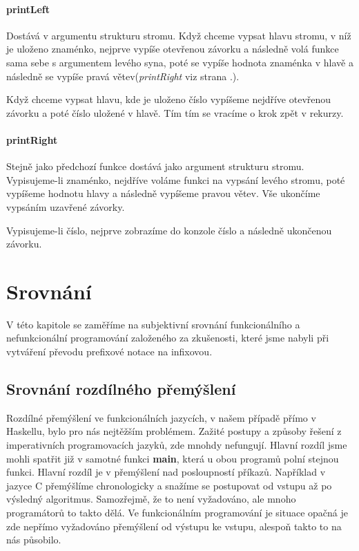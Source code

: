 \documentclass[12pt,a4paper]{report}
\begin{document}
\subsubsection{printLeft} \label{printLeft}
Dostává v argumentu strukturu stromu. Když chceme vypsat hlavu stromu, v níž je uloženo znaménko, nejprve vypíše otevřenou závorku a následně volá funkce sama sebe s argumentem levého syna, poté se vypíše hodnota znaménka v hlavě a následně se vypíše pravá větev(\textit{printRight} viz strana \pageref{printRight}.).

Když chceme vypsat hlavu, kde je uloženo číslo vypíšeme nejdříve otevřenou závorku a poté číslo uložené v hlavě. Tím tím se vracíme o krok zpět v rekurzy.
\newpage
\subsubsection{printRight} \label{printRight}
Stejně jako předchozí funkce dostává jako argument strukturu stromu. Vypisujeme-li znaménko, nejdříve voláme funkci na vypsání levého stromu, poté vypíšeme hodnotu hlavy a následně vypíšeme pravou větev. Vše ukončíme vypsáním uzavřené závorky.

Vypisujeme-li číslo, nejprve zobrazíme do konzole číslo a následně ukončenou závorku. 

\chapter{Srovnání}
V této kapitole se zaměříme na subjektivní srovnání funkcionálního a nefunkcionální programování založeného za zkušenosti, které jsme nabyli při vytváření převodu prefixové notace na infixovou. 

\section{Srovnání rozdílného přemýšlení}
Rozdílné přemýšlení ve funkcionálních jazycích, v našem případě přímo v Haskellu, bylo pro nás nejtěžším problémem. Zažité postupy a způsoby řešení z imperativních programovacích jazyků, zde mnohdy nefungují. Hlavní rozdíl jsme mohli spatřit již v samotné funkci \textbf{main}, která u obou programů polní stejnou funkci. Hlavní rozdíl je v přemýšlení nad posloupností příkazů. Například v jazyce C přemýšlíme chronologicky a snažíme se postupovat od vstupu až po výsledný algoritmus. Samozřejmě, že to není vyžadováno, ale mnoho programátorů to takto dělá. Ve funkcionálním programování je situace opačná je zde nepřímo vyžadováno přemýšlení od výstupu ke vstupu, alespoň takto to na nás působilo.  
\end{document}
